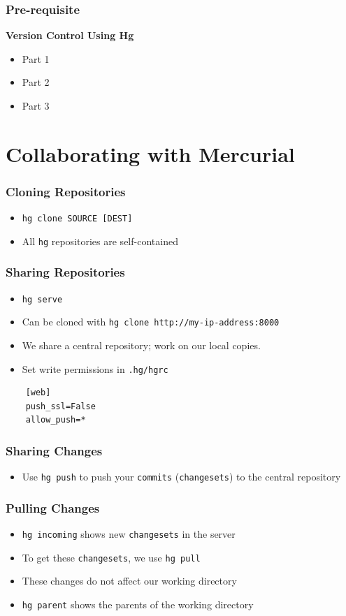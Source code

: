 \documentclass[12pt,compress]{beamer}
\newcommand{\typ}[1]{\lstinline{#1}}
\begin{document}
\begin{frame}
\frametitle{Pre-requisite}
\textbf{Version Control Using Hg}
	\begin{itemize}
	\item Part 1
	\item Part 2
	\item Part 3
	\end{itemize}
\end{frame}

\section{Collaborating with Mercurial}
\begin{frame}[fragile]
  \frametitle{Cloning Repositories}
  \begin{itemize}
  \item \typ{hg clone SOURCE [DEST]}
  \item All \typ{hg} repositories are self-contained
  \end{itemize}
\end{frame}

\begin{frame}[fragile]
  \frametitle{Sharing Repositories}
  \begin{itemize}
  \item \typ{hg serve}
  \item Can be cloned with \typ{hg clone http://my-ip-address:8000}
  \item We share a central repository; work on our local copies. 
  \item Set write permissions in \typ{.hg/hgrc}
  \end{itemize}
  \begin{lstlisting}
    [web]
    push_ssl=False
    allow_push=*
  \end{lstlisting}
\end{frame}

\begin{frame}
  \frametitle{Sharing Changes}
  \begin{itemize}
  \item Use \typ{hg push} to push your \typ{commits}
    (\typ{changesets}) to the central repository
  \end{itemize}
\end{frame}


\begin{frame}
  \frametitle{Pulling Changes}
  \begin{itemize}
  \item \typ{hg incoming} shows new \typ{changesets} in the server 
  \item To get these \typ{changesets}, we use \typ{hg pull}
  \item These changes do not affect our working directory
  \item \typ{hg parent} shows the parents of the working directory
  \end{itemize}
\end{frame}
\end{document}
